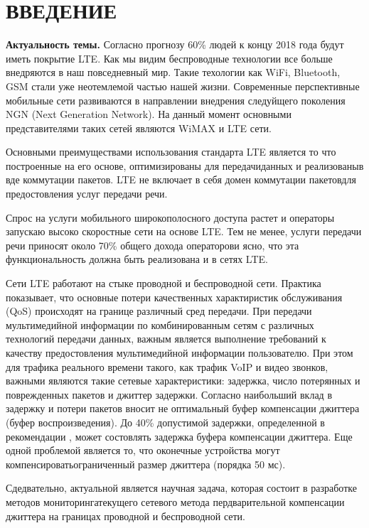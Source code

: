 \chapter*{ВВЕДЕНИЕ}							%

\textbf{Актуальность темы.} Согласно прогнозу \cite{ericsson} 60\% людей к концу 2018 года будут иметь покрытие LTE. Как мы видим беспроводные технологии все больше внедряются в наш повседневный мир. Такие техологии как WiFi, Bluetooth, GSM стали уже неотемлемой частью нашей жизни. 
Современные перспективные мобильные сети развиваются в направлении внедрения следуйщего поколения NGN (Next Generation Network). На данный момент основными представителями таких сетей являются WiMAX и LTE сети.

Основными преимуществами использования стандарта LTE является то что построенные на его основе, оптимизированы для передачиданных и реализованыв вде коммутации пакетов.
LTE не включает в себя домен коммутации пакетовдля предостовления услуг передачи речи.

Спрос на услуги мобильного широкополосного доступа растет и операторы запускаю высоко скоростные сети на основе LTE. Тем не менее, услуги передачи речи приносят около 70\% общего дохода операторови ясно, что эта функциональность должна быть реализована и в сетях LTE.

Сети LTE работают на стыке проводной и беспроводной сети. Практика показывает, что основные потери качественных характиристик обслуживания (QoS) происходят на границе различный сред передачи.
При передачи мультимедийной информации по комбинированным сетям с различных технологий передачи данных, важным является выполнение требований к качеству предостовления мультимедийной информации пользователю.
При этом для трафика реального времени такого, как трафик VoIP и видео звонков, важными являются такие сетевые характеристики:
задержка, число потерянных и поврежденных пакетов и джиттер задержки.
Согласно \cite{??} наибольший вклад в задержку и потери пакетов вносит не оптимальный буфер компенсации джиттера (буфер воспроизведения). До 40\% допустимой задержки, определенной в рекомендации \cite{G114}, может состовлять задержка буфера компенсации джиттера.
Еще одной проблемой является то, что оконечные устройства могут компенсироватьограниченный размер джиттера (порядка 50 мс).

Сдедвательно, актуальной является научная задача, которая состоит в разработке методов мониторингатекущего сетевого метода пердварительной компенсации джиттера на границах проводной и беспроводной сети.



